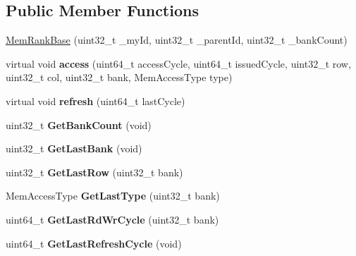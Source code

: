 \subsection*{Public Member Functions}
\begin{DoxyCompactItemize}
\item 
\hyperlink{classMemRankBase_aacf0992ac12f1a10c2159b7de3f8b464}{Mem\-Rank\-Base} (uint32\-\_\-t \-\_\-my\-Id, uint32\-\_\-t \-\_\-parent\-Id, uint32\-\_\-t \-\_\-bank\-Count)
\item 
\hypertarget{classMemRankBase_af7a73da8943b5dacc9847f35cc51884d}{virtual void {\bfseries access} (uint64\-\_\-t access\-Cycle, uint64\-\_\-t issued\-Cycle, uint32\-\_\-t row, uint32\-\_\-t col, uint32\-\_\-t bank, Mem\-Access\-Type type)}\label{classMemRankBase_af7a73da8943b5dacc9847f35cc51884d}

\item 
\hypertarget{classMemRankBase_a7ba9db3f4f52515794e8bad3df7bc92c}{virtual void {\bfseries refresh} (uint64\-\_\-t last\-Cycle)}\label{classMemRankBase_a7ba9db3f4f52515794e8bad3df7bc92c}

\item 
\hypertarget{classMemRankBase_a8261bb5be377b057348a60817f0b0b42}{uint32\-\_\-t {\bfseries Get\-Bank\-Count} (void)}\label{classMemRankBase_a8261bb5be377b057348a60817f0b0b42}

\item 
\hypertarget{classMemRankBase_accf69f66b82d81fcccc82c4fe20aa510}{uint32\-\_\-t {\bfseries Get\-Last\-Bank} (void)}\label{classMemRankBase_accf69f66b82d81fcccc82c4fe20aa510}

\item 
\hypertarget{classMemRankBase_a6f58b7856b52d6d711b8904e05e299fc}{uint32\-\_\-t {\bfseries Get\-Last\-Row} (uint32\-\_\-t bank)}\label{classMemRankBase_a6f58b7856b52d6d711b8904e05e299fc}

\item 
\hypertarget{classMemRankBase_ade57246375526c06def01af6a2273c3e}{Mem\-Access\-Type {\bfseries Get\-Last\-Type} (uint32\-\_\-t bank)}\label{classMemRankBase_ade57246375526c06def01af6a2273c3e}

\item 
\hypertarget{classMemRankBase_a2da4b2db453b09821f4ba51f8e0d29f4}{uint64\-\_\-t {\bfseries Get\-Last\-Rd\-Wr\-Cycle} (uint32\-\_\-t bank)}\label{classMemRankBase_a2da4b2db453b09821f4ba51f8e0d29f4}

\item 
\hypertarget{classMemRankBase_a53c7056c8456da311f8569353564c69f}{uint64\-\_\-t {\bfseries Get\-Last\-Refresh\-Cycle} (void)}\label{classMemRankBase_a53c7056c8456da311f8569353564c69f}


\end{DoxyCompactItemize}
